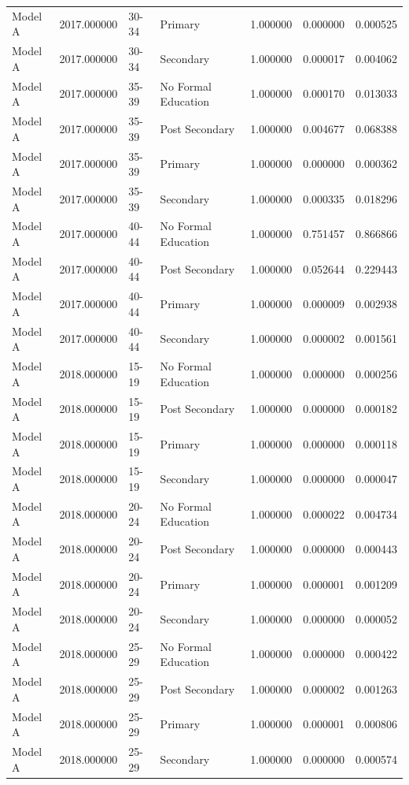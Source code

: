 \begin{table}[ht]
\begin{tabular}{lrllrrr}
Model A & 2017.000000 & 30-34 & Primary & 1.000000 & 0.000000 & 0.000525 \\
Model A & 2017.000000 & 30-34 & Secondary & 1.000000 & 0.000017 & 0.004062 \\
Model A & 2017.000000 & 35-39 & No Formal Education & 1.000000 & 0.000170 & 0.013033 \\
Model A & 2017.000000 & 35-39 & Post Secondary & 1.000000 & 0.004677 & 0.068388 \\
Model A & 2017.000000 & 35-39 & Primary & 1.000000 & 0.000000 & 0.000362 \\
Model A & 2017.000000 & 35-39 & Secondary & 1.000000 & 0.000335 & 0.018296 \\
Model A & 2017.000000 & 40-44 & No Formal Education & 1.000000 & 0.751457 & 0.866866 \\
Model A & 2017.000000 & 40-44 & Post Secondary & 1.000000 & 0.052644 & 0.229443 \\
Model A & 2017.000000 & 40-44 & Primary & 1.000000 & 0.000009 & 0.002938 \\
Model A & 2017.000000 & 40-44 & Secondary & 1.000000 & 0.000002 & 0.001561 \\
Model A & 2018.000000 & 15-19 & No Formal Education & 1.000000 & 0.000000 & 0.000256 \\
Model A & 2018.000000 & 15-19 & Post Secondary & 1.000000 & 0.000000 & 0.000182 \\
Model A & 2018.000000 & 15-19 & Primary & 1.000000 & 0.000000 & 0.000118 \\
Model A & 2018.000000 & 15-19 & Secondary & 1.000000 & 0.000000 & 0.000047 \\
Model A & 2018.000000 & 20-24 & No Formal Education & 1.000000 & 0.000022 & 0.004734 \\
Model A & 2018.000000 & 20-24 & Post Secondary & 1.000000 & 0.000000 & 0.000443 \\
Model A & 2018.000000 & 20-24 & Primary & 1.000000 & 0.000001 & 0.001209 \\
Model A & 2018.000000 & 20-24 & Secondary & 1.000000 & 0.000000 & 0.000052 \\
Model A & 2018.000000 & 25-29 & No Formal Education & 1.000000 & 0.000000 & 0.000422 \\
Model A & 2018.000000 & 25-29 & Post Secondary & 1.000000 & 0.000002 & 0.001263 \\
Model A & 2018.000000 & 25-29 & Primary & 1.000000 & 0.000001 & 0.000806 \\
Model A & 2018.000000 & 25-29 & Secondary & 1.000000 & 0.000000 & 0.000574 \\

\end{tabular}
\end{table}
